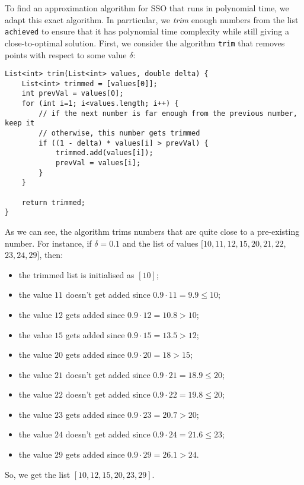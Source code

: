 \documentclass[a4paper, openany]{memoir}
\begin{document}
    To find an approximation algorithm for SSO that runs in polynomial time, we adapt this exact algorithm. In parrticular, we \textit{trim} enough numbers from the list \texttt{achieved} to ensure that it has polynomial time complexity while still giving a close-to-optimal solution. First, we consider the algorithm \texttt{trim} that removes points with respect to some value $\delta$:
\begin{lstlisting}[language=pseudocode]
List<int> trim(List<int> values, double delta) {
    List<int> trimmed = [values[0]];
    int prevVal = values[0];
    for (int i=1; i<values.length; i++) {
        // if the next number is far enough from the previous number, keep it
        // otherwise, this number gets trimmed
        if ((1 - delta) * values[i] > prevVal) {
            trimmed.add(values[i]);
            prevVal = values[i];
        }
    }

    return trimmed;
}
\end{lstlisting}
    As we can see, the algorithm trims numbers that are quite close to a pre-existing number. For instance, if $\delta = 0.1$ and the list of values $[10, 11, 12, 15, 20, 21, 22$, $23, 24, 29]$, then:
    \begin{itemize}
        \item the trimmed list is initialised as $[10]$;
        \item the value $11$ doesn't get added since $0.9 \cdot 11 = 9.9 \leq 10$;
        \item the value $12$ gets added since $0.9 \cdot 12 = 10.8 > 10$;
        \item the value $15$ gets added since $0.9 \cdot 15 = 13.5 > 12$;
        \item the value $20$ gets added since $0.9 \cdot 20 = 18 > 15$;
        \item the value $21$ doesn't get added since $0.9 \cdot 21 = 18.9 \leq 20$;
        \item the value $22$ doesn't get added since $0.9 \cdot 22 = 19.8 \leq 20$;
        \item the value $23$ gets added since $0.9 \cdot 23 = 20.7 > 20$;
        \item the value $24$ doesn't get added since $0.9 \cdot 24 = 21.6 \leq 23$;
        \item the value $29$ gets added since $0.9 \cdot 29 = 26.1 > 24$.
    \end{itemize}
    So, we get the list $[10, 12, 15, 20, 23, 29]$. 
    
\end{document}
